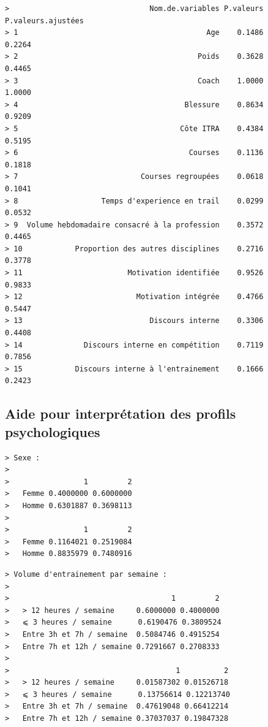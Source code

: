 \documentclass[
]{article}
\begin{document}
\begin{verbatim}
>                                Nom.de.variables P.valeurs P.valeurs.ajustées
> 1                                           Age    0.1486             0.2264
> 2                                         Poids    0.3628             0.4465
> 3                                         Coach    1.0000             1.0000
> 4                                      Blessure    0.8634             0.9209
> 5                                     Côte ITRA    0.4384             0.5195
> 6                                       Courses    0.1136             0.1818
> 7                            Courses regroupées    0.0618             0.1041
> 8                   Temps d'experience en trail    0.0299             0.0532
> 9  Volume hebdomadaire consacré à la profession    0.3572             0.4465
> 10            Proportion des autres disciplines    0.2716             0.3778
> 11                        Motivation identifiée    0.9526             0.9833
> 12                          Motivation intégrée    0.4766             0.5447
> 13                             Discours interne    0.3306             0.4408
> 14              Discours interne en compétition    0.7119             0.7856
> 15            Discours interne à l'entrainement    0.1666             0.2423
\end{verbatim}

\hypertarget{aide-pour-interpruxe9tation-des-profils-psychologiques}{%
\subsection{Aide pour interprétation des profils
psychologiques}\label{aide-pour-interpruxe9tation-des-profils-psychologiques}}

\begin{verbatim}
> Sexe :
>        
>                 1         2
>   Femme 0.4000000 0.6000000
>   Homme 0.6301887 0.3698113
>        
>                 1         2
>   Femme 0.1164021 0.2519084
>   Homme 0.8835979 0.7480916
\end{verbatim}

\begin{verbatim}
> Volume d'entrainement par semaine :
>                            
>                                     1         2
>   > 12 heures / semaine     0.6000000 0.4000000
>   ⩽ 3 heures / semaine      0.6190476 0.3809524
>   Entre 3h et 7h / semaine  0.5084746 0.4915254
>   Entre 7h et 12h / semaine 0.7291667 0.2708333
>                            
>                                      1          2
>   > 12 heures / semaine     0.01587302 0.01526718
>   ⩽ 3 heures / semaine      0.13756614 0.12213740
>   Entre 3h et 7h / semaine  0.47619048 0.66412214
>   Entre 7h et 12h / semaine 0.37037037 0.19847328
\end{verbatim}
\end{document}
